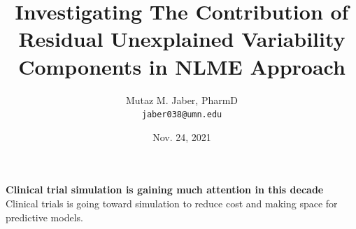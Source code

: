 \documentclass[usepdftitle=false, aspectratio=169]{beamer}
\title
{
    \fontsize{12}{10}\textbf{Investigating The Contribution of Residual Unexplained Variability Components in NLME Approach}
}
\author{Mutaz M. Jaber, PharmD \\ \texttt{jaber038@umn.edu}}
\institute{PhD student at Dept. of Expreimental and Clinical pharmacology}
\date{Nov. 24, 2021}
\begin{document}
\begin{frame}
    \titlepage 
\end{frame}

\begin{frame}
    {\textbf{Clinical trial simulation is gaining much attention in this decade}}
Clinical trials is going toward simulation to reduce cost and making space for predictive models. 
\end{frame}
\end{document}
